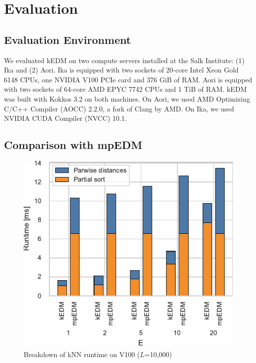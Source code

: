 \documentclass[conference]{IEEEtran}
\begin{document}
\section{Evaluation}

\subsection{Evaluation Environment}


We evaluated kEDM on two compute servers installed at the Salk Institute: (1)
Ika and (2) Aori. Ika is equipped with two sockets of 20-core Intel Xeon Gold
6148 CPUs, one NVIDIA V100 PCIe card and 376 GiB of RAM\@. Aori is equipped with
two sockets of 64-core AMD EPYC 7742 CPUs and 1 TiB of RAM\@. kEDM was built
with Kokkos 3.2 on both machines. On Aori, we used AMD Optimizing C/C++ Compiler
(AOCC) 2.2.0, a fork of Clang by AMD. On Ika, we used NVIDIA CUDA Compiler (NVCC)
10.1.

\subsection{Comparison with mpEDM}

\begin{figure}
    \centering
    \includegraphics{figs/breakdown_knn_v100}
    \caption{Breakdown of kNN runtime on V100 ($L$=10,000)}%
    \label{fig:breakdown-knn-v100}
\end{figure}
\end{document}
